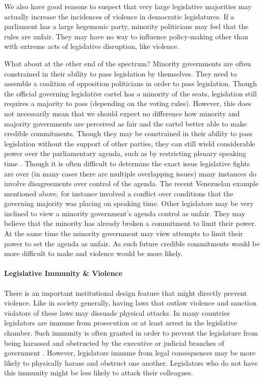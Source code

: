\documentclass[a4paper]{article}\usepackage[]{graphicx}\usepackage[]{color}
\begin{document}
We also have good reasons to suspect that very large legislative majorities may actually increase the incidences of violence in democratic legislatures. If a parliament has a large hegemonic party, minority politicians may feel that the rules are unfair. They may have no way to influence policy-making other than with extreme acts of legislative disruption, like violence.

What about at the other end of the spectrum? Minority governments are often constrained in their ability to pass legislation by themselves. They need to assemble a coalition of opposition politicians in order to pass legislation. Though the official governing legislative cartel has a minority of the seats, legislation still requires a majority to pass (depending on the voting rules). However, this does not necessarily mean that we should expect no difference how minority and majority governments are perceived as fair and the cartel better able to make credible commitments. Though they may be constrained in their ability to pass legislation without the support of other parties, they can still wield considerable power over the parliamentary agenda, such as by restricting plenary speaking time \citep{Tsebelis2002,cox2005,cox2007}. Though it is often difficult to determine the exact issue legislative fights are over (in many cases there are multiple overlapping issues) many instances do involve disagreements over control of the agenda. The recent Venezuelan example mentioned above, for instance involved a conflict over conditions that the governing majority was placing on speaking time. Other legislators may be very inclined to view a minority government's agenda control as unfair. They may believe that the minority has already broken a commitment to limit their power. At the same time the minority government may view attempts to limit their power to set the agenda as unfair. As such future credible commitments would be more difficult to make and violence would be more likely. 

\paragraph{Legislative Immunity \& Violence}

There is an important institutional design feature that might directly prevent violence. Like in society generally, having laws that outlaw violence and sanction violators of these laws may dissuade physical attacks. In many countries legislators are immune from prosecution or at least arrest in the legislative chamber. Such immunity is often granted in order to prevent the legislature from being harassed and obstructed by the executive or judicial branches of government  \citep{Seghetti1984}. However, legislators immune from legal consequences may be more likely to physically harass and obstruct one another. Legislators who do not have this immunity might be less likely to attack their colleagues. 
\end{document}
